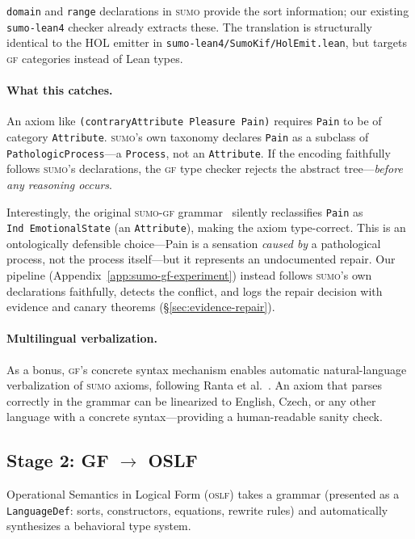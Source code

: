 \documentclass[11pt]{article}
\newcommand{\SUMO}{\textsc{sumo}}
\newcommand{\GF}{\textsc{gf}}
\newcommand{\OSLF}{\textsc{oslf}}
\theoremstyle{definition}
\theoremstyle{plain}
\begin{document}
\texttt{domain} and \texttt{range} declarations in \SUMO{} provide
the sort information; our existing \texttt{sumo-lean4} checker already
extracts these.
The translation is structurally identical to the HOL emitter in
\texttt{sumo-lean4/SumoKif/HolEmit.lean}, but targets \GF{} categories
instead of Lean types.

\paragraph{What this catches.}
An axiom like \texttt{(contraryAttribute Pleasure Pain)} requires
\texttt{Pain} to be of category \texttt{Attribute}.  \SUMO{}'s own
taxonomy declares \texttt{Pain} as a subclass of
\texttt{PathologicProcess}---a \texttt{Process}, not an
\texttt{Attribute}.  If the encoding faithfully follows \SUMO{}'s
declarations, the \GF{} type checker rejects the abstract
tree---\emph{before any reasoning occurs}.

Interestingly, the original \SUMO{}-\GF{} grammar~\cite{enache2012sumogf}
silently reclassifies \texttt{Pain} as \texttt{Ind~EmotionalState}
(an \texttt{Attribute}), making the axiom type-correct.  This is an
ontologically defensible choice---Pain is a sensation \emph{caused by}
a pathological process, not the process itself---but it represents an
undocumented repair.  Our pipeline
(Appendix~\ref{app:sumo-gf-experiment}) instead follows \SUMO{}'s
own declarations faithfully, detects the conflict, and logs the repair
decision with evidence and canary theorems
(\S\ref{sec:evidence-repair}).

\paragraph{Multilingual verbalization.}
As a bonus, \GF{}'s concrete syntax mechanism enables automatic
natural-language verbalization of \SUMO{} axioms, following Ranta
et al.~\cite{ranta-typeful-ontologies}.
An axiom that parses correctly in the grammar can be linearized to
English, Czech, or any other language with a concrete syntax---providing
a human-readable sanity check.

\subsection{Stage 2: GF $\to$ OSLF}
\label{sec:stage2}

Operational Semantics in Logical Form (\OSLF{}) takes a grammar
(presented as a \texttt{LanguageDef}: sorts, constructors, equations,
rewrite rules) and automatically synthesizes a behavioral type system.
\end{document}
